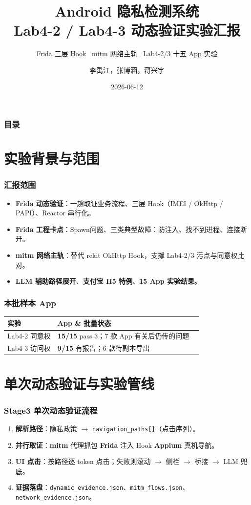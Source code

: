 \documentclass[AutoFakeBold,AutoFakeSlant]{beamer}
\author{李禹江，张博涵，蒋兴宇}
\title{Android 隐私检测系统\\Lab4-2 / Lab4-3 动态验证实验汇报}
\subtitle{Frida 三层 Hook \textbullet\ mitm 网络主轨 \textbullet\ Lab4-2/3 十五 App 实验}
\institute{我的刀盾队}
\date{2026-06-12}
\newcommand{\sepbar}{\quad\textbar\quad}
\newcommand{\arrown}{\ensuremath{\rightarrow}}
\begin{document}
\kaishu

\begin{frame}
    \titlepage
\end{frame}

\begin{frame}
    \frametitle{目录}
    \tableofcontents
\end{frame}

\section{实验背景与范围}

\begin{frame}
    \frametitle{汇报范围}
    \small
    \begin{itemize}
        \item \textbf{Frida 动态验证}：一趟取证业务流程、三层 Hook（IMEI / OkHttp / PAPI）、Reactor 串行化。
        \item \textbf{Frida 工程卡点}：Spawn问题、三类典型故障：防注入、找不到进程、连接断开。
        \item \textbf{mitm 网络主轨}：替代 rekit OkHttp Hook，支撑 Lab4-2/3 污点与同意权比对。
        \item \textbf{LLM 辅助路径展开}、\textbf{支付宝 H5 特例}、\textbf{15 App 实验结果}。
    \end{itemize}
\end{frame}

\begin{frame}
    \frametitle{本批样本 App}
    \small
    \begin{tabularx}{\textwidth}{|l|X|l|}
        \hline
        \textbf{实验} & \textbf{App} \& \textbf{批量状态} \\
        \hline
        Lab4-2 同意权 & \textbf{15/15} pass 3；7 款 App 有关后仍传的问题 \\
        \hline
        Lab4-3 访问权 & \textbf{9/15} 有报告；6 款待副本导出 \\
        \hline
    \end{tabularx}
\end{frame}

\section{单次动态验证与实验管线}

\begin{frame}
    \frametitle{Stage3 单次动态验证流程}
    \small
    \begin{enumerate}
        \item \textbf{解析路径}：隐私政策 \arrown{} \texttt{navigation\_paths{[]}}（点击序列）。
        \item \textbf{并行取证}：\textbf{mitm} 代理抓包 \sepbar \textbf{Frida} 注入 Hook \sepbar \textbf{Appium} 真机导航。
        \item \textbf{UI 点击}：按路径逐 token 点击；失败则滚动 \arrown{} 侧栏 \arrown{} 桥接 \arrown{} LLM 兜底。
        \item \textbf{证据落盘}：\texttt{dynamic\_evidence.json}、\texttt{mitm\_flows.json}、\texttt{network\_evidence.json}。
    \end{enumerate}
\end{frame}
\end{document}
